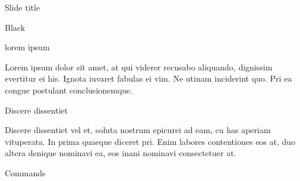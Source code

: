 \documentclass{MichiganTech}
\begin{document}
%
\begin{frame}[t]{Slide title}
  \vspace*{0.10in}
  \begin{reference}{4mm}{85.5mm}{Black}
    \;
  \end{reference}

  \begin{beamerboxesrounded}[upper=definitionboxhead,lower=definitionboxbody,shadow=true]{lorem ipsum}
    \begin{flushleft}
      Lorem ipsum dolor sit amet, at qui viderer recusabo aliquando, dignissim
      evertitur ei his. Ignota iuvaret fabulas ei vim. Ne utinam inciderint quo.
      Pri ea congue postulant conclusionemque.
    \end{flushleft}
  \end{beamerboxesrounded}

  \pause
  \vspace*{0.10in}
  \begin{beamerboxesrounded}[upper=questionboxhead,lower=questionboxbody,shadow=true]{Discere dissentiet}
    \begin{flushleft}
      Discere dissentiet vel et, soluta nostrum epicurei ad eam, cu has aperiam
      vituperata. In prima quaeque diceret pri. Enim labores contentiones eos 
      at, duo altera denique nominavi ea, eos inani nominavi consectetuer at.
    \end{flushleft}
  \end{beamerboxesrounded}

  \pause
  \vspace*{0.10in}
  \begin{beamerboxesrounded}[upper=commandboxhead,lower=commandboxbody,shadow=true]{Commands}
    \begin{flushleft}
      \\
    \end{flushleft}
  \end{beamerboxesrounded}
\end{frame}
\end{document}
